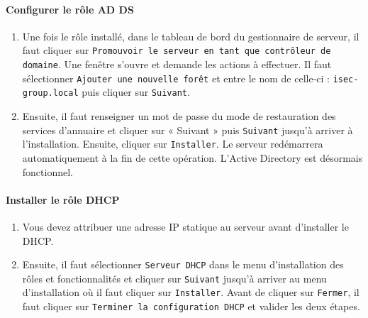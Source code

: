  			\paragraph{Configurer le rôle AD DS}
				\begin{enumerate}
					\item Une fois le rôle installé, dans le tableau de bord du gestionnaire de serveur, il faut cliquer sur \texttt{Promouvoir le serveur en tant que contrôleur de domaine}. Une fenêtre s’ouvre et demande les actions à effectuer. Il faut sélectionner \texttt{Ajouter une nouvelle forêt} et entre le nom de celle-ci : \texttt{isec-group.local} puis cliquer sur \texttt{Suivant}. 
					\item Ensuite, il faut renseigner un mot de passe du mode de restauration des services d’annuaire et cliquer sur « Suivant » puis \texttt{Suivant} jusqu’à arriver à l’installation. Ensuite, cliquer sur \texttt{Installer}. Le serveur redémarrera automatiquement à la fin de cette opération. L’Active Directory est désormais fonctionnel.
				\end{enumerate}

			\paragraph{Installer le rôle DHCP}
				\begin{enumerate}
					\item Vous devez attribuer une adresse IP statique au serveur avant d’installer le DHCP.
					\item Ensuite, il faut sélectionner \texttt{Serveur DHCP} dans le menu d’installation des rôles et fonctionnalités et cliquer sur \texttt{Suivant} jusqu’à arriver au menu d’installation où il faut cliquer sur \texttt{Installer}. Avant de cliquer sur \texttt{Fermer}, il faut cliquer sur \texttt{Terminer la configuration DHCP} et valider les deux étapes.
				\end{enumerate}
